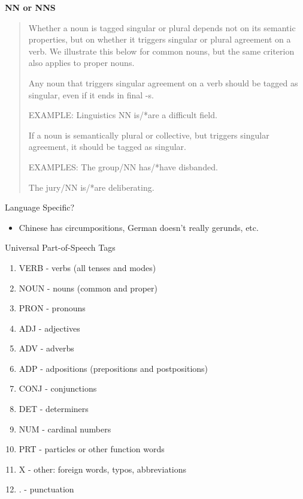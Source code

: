 \documentclass{beamer}
\begin{document}
\begin{frame}


\textbf{NN or NNS}

\begin{quote}
  Whether a noun is tagged singular or plural depends not on its
  semantic properties, but on whether it triggers singular or plural
  agreement on a verb. We illustrate this below for common nouns, but
  the same criterion also applies to proper nouns.
  
Any noun that triggers singular agreement on a verb should be tagged as singular, even if it ends in final -s.

\air 

\textnormal{EXAMPLE: Linguistics NN is/*are a difficult field.}

\air 
If a noun is semantically plural or collective, but triggers singular agreement, it should be tagged as
singular.

\air 
\textnormal{EXAMPLES: The group/NN has/*have disbanded.}

\textnormal{The jury/NN is/*are deliberating.} 

\end{quote}

\end{frame}


\begin{frame}{Language Specific?}
  \begin{itemize}
  \item Chinese has circumpositions, German doesn't really gerunds, etc. 
  \end{itemize}
\end{frame}

\begin{frame}{Universal Part-of-Speech Tags}

  \begin{enumerate}
  \item VERB - verbs (all tenses and modes)
  \item NOUN - nouns (common and proper)
  \item PRON - pronouns 
  \item ADJ - adjectives
  \item ADV - adverbs
  \item ADP - adpositions (prepositions and postpositions)
  \item CONJ - conjunctions
  \item DET - determiners
  \item NUM - cardinal numbers
  \item PRT - particles or other function words
  \item X - other: foreign words, typos, abbreviations
  \item . - punctuation
\end{enumerate}
\end{frame}
\end{document}
